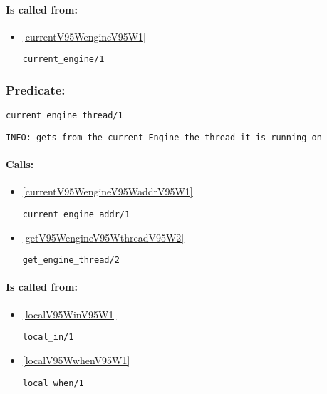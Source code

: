 \paragraph{Is called from:} 
\begin{itemize}
\item \ref{currentV95WengineV95W1} 
\begin{verbatim}
current_engine/1
\end{verbatim}

\end{itemize}

\subsubsection{Predicate:} \label{currentV95WengineV95WthreadV95W1}

\begin{verbatim}
current_engine_thread/1
\end{verbatim}

{\small \begin{verbatim}
INFO: gets from the current Engine the thread it is running on

\end{verbatim}}
\paragraph{Calls:} 
\begin{itemize}
\item \ref{currentV95WengineV95WaddrV95W1} 
\begin{verbatim}
current_engine_addr/1
\end{verbatim}

\item \ref{getV95WengineV95WthreadV95W2} 
\begin{verbatim}
get_engine_thread/2
\end{verbatim}

\end{itemize}
\paragraph{Is called from:} 
\begin{itemize}
\item \ref{localV95WinV95W1} 
\begin{verbatim}
local_in/1
\end{verbatim}

\item \ref{localV95WwhenV95W1} 
\begin{verbatim}
local_when/1
\end{verbatim}

\end{itemize}


